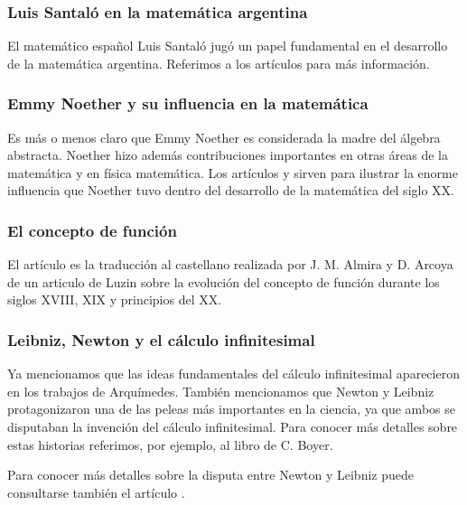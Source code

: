 

\subsubsection*{Luis Santaló en la matemática argentina}

El matemático español Luis Santaló jugó un papel fundamental
en el desarrollo de la matemática argentina. Referimos a 
los artículos 
\cite{zbMATH06696371,zbMATH06696401} para más información.



% 
\subsubsection*{Emmy Noether y su influencia en la matemática}

Es más o menos claro que Emmy Noether es considerada la madre del álgebra abstracta. 
Noether hizo además contribuciones importantes en otras áreas de la matemática 
y en física matemática. Los artículos 
\cite{zbMATH06696362} y \cite{zbMATH06696361} sirven para 
ilustrar la enorme influencia que Noether tuvo dentro del 
desarrollo de la matemática
del siglo XX. 

\subsubsection*{El concepto de función}

El artículo \cite{zbMATH02353879} es la traducción al castellano 
realizada por J. M. Almira y D. Arcoya de un 
articulo de Luzin sobre la evolución del 
concepto de función durante los siglos XVIII, XIX y principios del XX.

\subsubsection*{Leibniz, Newton y el cálculo infinitesimal}

Ya mencionamos que las ideas fundamentales del cálculo infinitesimal 
aparecieron en los trabajos de Arquímedes. También mencionamos que
Newton y Leibniz protagonizaron una de las peleas más importantes
en la ciencia, ya que ambos se disputaban la invención del cálculo 
infinitesimal. Para conocer más detalles sobre estas historias
referimos, por ejemplo, al libro 
\cite{MR0124178} de C. Boyer. 

Para conocer más detalles sobre la disputa entre Newton y Leibniz 
puede consultarse también el artículo \cite{MR4224032}. 
